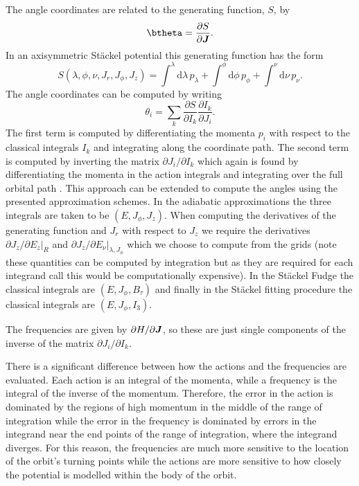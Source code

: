 \documentclass[useAMS,usenatbib,fleqn,a4paper]{mn2e}
\newcommand{\bs}[1]{\bmath{#1}}
\begin{document}
The angle
coordinates are related to the generating function, $S$, by
\begin{equation}
\btheta = \frac{\partial S}{\partial \bs{J}}.
\end{equation}
In an axisymmetric  St\"ackel  potential this generating function has the form
\begin{equation}
S(\lambda,\phi,\nu,J_r,J_\phi,J_z) = \int^\lambda\mathrm{d}\lambda\,p_\lambda
+\int^\phi\mathrm{d}\phi\,p_\phi+\int^\nu\mathrm{d}\nu\,p_\nu.
\end{equation}
 The angle coordinates can be computed by writing
\begin{equation}
\theta_i = \sum_k\frac{\partial S}{\partial I_k}\frac{\partial I_k}{\partial J_i}.
\end{equation}
 The first term is computed by differentiating the
momenta $p_i$ with respect to the classical integrals $I_k$ and
integrating along the coordinate path. The second term is computed by
inverting the matrix $\partial J_i/\partial I_k$ which again is found
by differentiating the momenta in the action integrals and integrating over
the full orbital path  \citep[see for example the appendix of][]{Sanders2012a}.
This approach can be extended to compute the angles using the presented
approximation schemes. In the adiabatic approximations the three integrals
are taken to be $(E,J_\phi,J_z)$. When computing the derivatives of the
generating function and $J_r$ with respect to $J_z$ we require the
derivatives $\partial J_z/\partial E_z|_R$ and $\partial J_z/\partial
E_\nu|_{\lambda,J_\phi}$ which we choose to compute from the grids (note these quantities can be computed by integration but as they are required for each integrand call this would be computationally expensive). In the
St\"ackel Fudge the classical integrals are $(E,J_\phi,B_\tau)$ and finally
in the St\"ackel fitting procedure the classical integrals are $(E,J_\phi,I_3)$.

The frequencies are given by
$\partial H/\partial \bs{J}$, so these are just single components of the
inverse of the matrix $\partial J_i/\partial I_k$.

There is a significant difference between how the actions and the frequencies
are evaluated. Each action is an integral of the momenta, while a frequency
is the integral of the inverse of the momentum. Therefore, the error in the
action is dominated by the regions of high momentum in the middle of the
range of integration while the error in the frequency is dominated by errors
in the integrand near the end points of the range of integration, where the
integrand diverges. For this reason, the frequencies are much more sensitive
to the location of the orbit's turning points while the actions are more
sensitive to how closely the potential is modelled within the body of the orbit.
\end{document}
